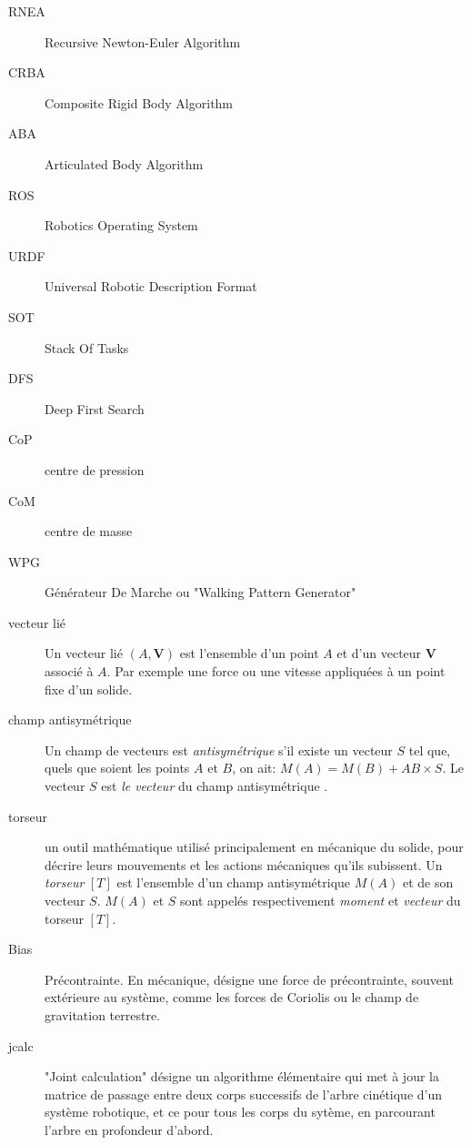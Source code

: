 \documentclass{report}
\begin{document}
\begin{description}
\item[RNEA   ]{Recursive Newton-Euler Algorithm}
\item[CRBA   ]{Composite Rigid Body Algorithm}
\item[ABA   ]{Articulated Body Algorithm}
\item[ROS   ]{Robotics Operating System \cite{bib_ros}}
\item[URDF   ]{Universal Robotic Description Format \cite{bib_urdf}}
\item[SOT   ]{Stack Of Tasks}
\item[DFS   ]{Deep First Search}
\item[CoP   ]{centre de pression}
\item[CoM   ]{centre de masse}
\item[WPG   ]{Générateur De Marche ou "Walking Pattern Generator"}
\item[vecteur lié   ]{Un vecteur lié $(A,\textbf{V})$ est l'ensemble d'un point $A$ et d'un vecteur $\textbf{V}$ associé à $A$. Par exemple une force ou une vitesse appliquées à un point fixe d'un solide.}
\item[champ antisymétrique   ]{Un champ de vecteurs est \emph{antisymétrique} s'il existe un vecteur $S$ tel que, quels que soient les points $A$ et $B$, on ait: $M(A)=M(B)+AB \times S$. Le vecteur $S$ est \emph{le vecteur} du champ antisymétrique \cite{bib_champVecteurs}.}
\item[torseur   ]{un outil mathématique utilisé principalement en mécanique du solide, pour décrire leurs mouvements et les actions mécaniques qu'ils subissent. Un \emph{torseur} $[T]$ est l'ensemble d'un champ antisymétrique $M(A)$ et de son vecteur $S$. $M(A)$ et $S$ sont appelés respectivement \emph{moment} et \emph{vecteur} du torseur $[T]$.}
\item[Bias   ]{Précontrainte. En mécanique, désigne une force de précontrainte, souvent extérieure au système, comme les forces de Coriolis ou le champ de gravitation terrestre.}
\item[jcalc   ]{"Joint calculation" désigne un algorithme élémentaire qui met à jour la matrice de passage entre deux corps successifs de l'arbre cinétique d'un système robotique, et ce pour tous les corps du sytème, en parcourant l'arbre en profondeur d'abord.}

\end{description}
\end{document}
